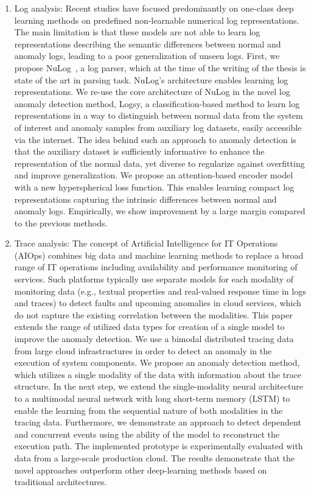 \begin{enumerate}
    \item Log analysis:  Recent studies have focused predominantly on one-class deep learning methods on predefined non-learnable numerical log representations. The main limitation is that these models are not able to learn log representations describing the semantic differences between normal and anomaly logs, leading to a poor generalization of unseen logs. First, we propose NuLog~\cite{nedelkoski2020selfsupervised}, a log parser, which at the time of the writing of the thesis is state of the art in parsing task. NuLog's architecture enables learning log representations. We re-use the core architecture of NuLog in the novel log anomaly detection method, Logsy, a classification-based method to learn log representations in a way to distinguish between normal data from the system of interest and anomaly samples from auxiliary log datasets, easily accessible via the internet. The idea behind such an approach to anomaly detection is that the auxiliary dataset is sufficiently informative to enhance the representation of the normal data, yet diverse to regularize against overfitting and improve generalization. We propose an attention-based encoder model with a new hyperspherical loss function. This enables learning compact log representations capturing the intrinsic differences between normal and anomaly logs. Empirically, we show improvement by a large margin compared to the previous methods.
    \item Trace analysis:
    The concept of Artificial Intelligence for IT Operations (AIOps) combines big data and machine learning methods to replace a broad range of IT operations including availability and performance monitoring of services. Such platforms typically use separate models for each modality of monitoring data (e.g., textual properties and real-valued response time in logs and traces) to detect faults and upcoming anomalies in cloud services, which do not capture the existing correlation between the modalities. This paper extends the range of utilized data types for creation of a single model to improve the anomaly detection. We use a bimodal distributed tracing data from large cloud infrastructures in order to detect an anomaly in the execution of system components. We propose an anomaly detection method, which utilizes a single modality of the data with information about the trace structure. In the next step, we extend the single-modality neural architecture to a multimodal neural network with long short-term memory (LSTM) to enable the learning from the sequential nature of both modalities in the tracing data. Furthermore, we demonstrate an approach to detect dependent and concurrent events using the ability of the model to reconstruct the execution path. The implemented prototype is experimentally evaluated with data from a large-scale production cloud. The results demonstrate that the novel approaches outperform other deep-learning methods based on traditional architectures.

\end{enumerate}
